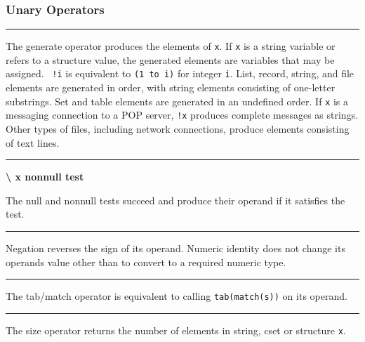 \subsubsection{Unary Operators}

\bigskip\hrule\vspace{0.1cm}

\noindent
{}The generate
operator produces the elements of \texttt{x}. If
\texttt{x} is a string variable or refers to a structure value, the
generated elements are variables that may be assigned. \ \texttt{!i} is
equivalent to \texttt{(1 to i)} for integer \texttt{i}. List, record,
string, and file elements are generated in order, with string elements
consisting of one-letter substrings. Set and table elements are
generated in an undefined order. If \texttt{x} is a messaging
connection to a POP server, \texttt{!x} produces complete messages as
strings. Other types of files, including network connections, produce
elements consisting of text lines.

\bigskip\hrule\vspace{0.1cm}

\noindent
{\bf {\textbackslash} x \hfill nonnull test}

\noindent
The null and nonnull tests succeed
and produce their operand if it satisfies the test.

\bigskip\hrule\vspace{0.1cm}


\noindent
Negation reverses the sign of its operand. Numeric identity does not
change its operand{\textquotesingle}s value other than to convert to a
required numeric type.

\bigskip\hrule\vspace{0.1cm}

\noindent
{}The tab/match operator is equivalent to calling
\texttt{tab(match(s))} on its operand.

\bigskip\hrule\vspace{0.1cm}

\noindent
The size operator returns the number of elements in
string, cset or structure \texttt{x}.


